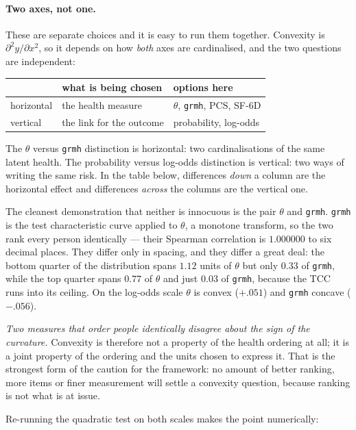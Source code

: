 \documentclass[11pt]{article}
\newcommand{\code}[1]{\texttt{\small #1}}
\begin{document}
\paragraph{Two axes, not one.} These are separate choices and it is easy to
run them together. Convexity is $\partial^2 y / \partial x^2$, so it depends
on how \emph{both} axes are cardinalised, and the two questions are
independent:

\begin{center}\small
\begin{tabular}{lll}
\toprule
 & what is being chosen & options here \\
\midrule
horizontal & the health measure & $\theta$, \code{grmh}, PCS, SF-6D \\
vertical & the link for the outcome & probability, log-odds \\
\bottomrule
\end{tabular}
\end{center}

The $\theta$ versus \code{grmh} distinction is horizontal: two
cardinalisations of the same latent health. The probability versus log-odds
distinction is vertical: two ways of writing the same risk. In the table
below, differences \emph{down} a column are the horizontal effect and
differences \emph{across} the columns are the vertical one.

The cleanest demonstration that neither is innocuous is the pair $\theta$ and
\code{grmh}. \code{grmh} is the test characteristic curve applied to
$\theta$, a monotone transform, so the two rank every person identically ---
their Spearman correlation is $1.000000$ to six decimal places. They differ
only in spacing, and they differ a great deal: the bottom quarter of the
distribution spans $1.12$ units of $\theta$ but only $0.33$ of \code{grmh},
while the top quarter spans $0.77$ of $\theta$ and just $0.03$ of
\code{grmh}, because the TCC runs into its ceiling. On the log-odds scale
$\theta$ is convex ($+.051$) and \code{grmh} concave ($-.056$).

\emph{Two measures that order people identically disagree about the sign of
the curvature.} Convexity is therefore not a property of the health ordering
at all; it is a joint property of the ordering and the units chosen to
express it. That is the strongest form of the caution for the framework: no
amount of better ranking, more items or finer measurement will settle a
convexity question, because ranking is not what is at issue.

Re-running the quadratic test on both scales makes the point numerically:
\end{document}
